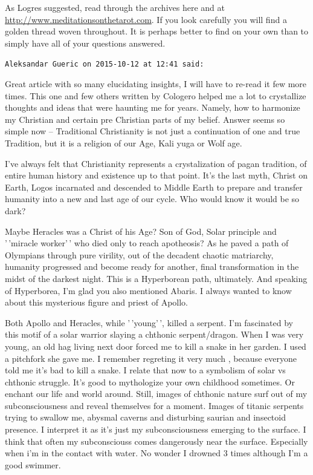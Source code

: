 \begin{footnotesize}
\begin{sffamily}
As Logres suggested, read through the archives here and at \url{http://www.meditationsonthetarot.com}. If you look carefully you will find a golden thread woven throughout. It is perhaps better to find on your own than to simply have all of your questions answered.

\hfill

\texttt{Aleksandar Gueric on 2015-10-12 at 12:41 said:}

Great article with so many elucidating insights, I will have to re-read it few more times. This one and few others written by Cologero helped me a lot to crystallize thoughts and ideas that were haunting me for years. Namely, how to harmonize my Christian and certain pre Christian parts of my belief. Answer seems so simple now -- Traditional Christianity is not just a continuation of one and true Tradition, but it is a religion of our Age, Kali yuga or Wolf age.

I've always felt that Christianity represents a crystalization of pagan tradition, of entire human history and existence up to that point. It's the last myth, Christ on Earth, Logos incarnated and descended to Middle Earth to prepare and transfer humanity into a new and last age of our cycle. Who would know it would be so dark?

Maybe Heracles was a Christ of his Age? Son of God, Solar principle and '\,'miracle worker'\,' who died only to reach apotheosis? As he paved a path of Olympians through pure virility, out of the decadent chaotic matriarchy, humanity progressed and become ready for another, final transformation in the midst of the darkest night. This is a Hyperborean path, ultimately. And speaking of Hyperborea, I'm glad you also mentioned Abaris. I always wanted to know about this mysterious figure and priest of Apollo.

Both Apollo and Heracles, while '\,'young'\,', killed a serpent. I'm fascinated by this motif of a solar warrior slaying a chthonic serpent/dragon. When I was very young, an old hag living next door forced me to kill a snake in her garden. I used a pitchfork she gave me. I remember regreting it very much , because everyone told me it's bad to kill a snake. I relate that now to a symbolism of solar vs chthonic struggle. It's good to mythologize your own childhood sometimes. Or enchant our life and world around. Still, images of chthonic nature surf out of my subconsciousness and reveal themselves for a moment. Images of titanic serpents trying to swallow me, abysmal caverns and disturbing saurian and insectoid presence. I interpret it as it's just my subconsciousness emerging to the surface. I think that often my subconsciouss comes dangerously near the surface. Especially when i'm in the contact with water. No wonder I drowned 3 times although I'm a good swimmer.


\end{sffamily}
\end{footnotesize}
